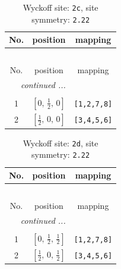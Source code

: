 \documentclass[fleqn,8pt]{jsarticle}
\begin{document}
\renewcommand{\arraystretch}{1.2}
\begin{longtable}{ccc}
\caption{Wyckoff site: {\tt 2c}, site symmetry: {\tt 2.22}}
 \\
 \hline \hline
No. & position & mapping \\ \hline \endfirsthead

\multicolumn{2}{l}{\tablename\ \thetable{}} \\
 \hline \hline
No. & position & mapping \\ \hline \endhead

 \hline \hline
\multicolumn{2}{r}{\footnotesize\it continued ...} \\ \endfoot

 \hline \hline
\multicolumn{2}{r}{} \\ \endlastfoot

1 & $\left[ 0,\, \frac{1}{2},\, 0 \right]$ & {\tt [1,2,7,8]} \\ \hline
2 & $\left[ \frac{1}{2},\, 0,\, 0 \right]$ & {\tt [3,4,5,6]} \\
\end{longtable}
\renewcommand{\arraystretch}{1.2}
\begin{longtable}{ccc}
\caption{Wyckoff site: {\tt 2d}, site symmetry: {\tt 2.22}}
 \\
 \hline \hline
No. & position & mapping \\ \hline \endfirsthead

\multicolumn{2}{l}{\tablename\ \thetable{}} \\
 \hline \hline
No. & position & mapping \\ \hline \endhead

 \hline \hline
\multicolumn{2}{r}{\footnotesize\it continued ...} \\ \endfoot

 \hline \hline
\multicolumn{2}{r}{} \\ \endlastfoot

1 & $\left[ 0,\, \frac{1}{2},\, \frac{1}{2} \right]$ & {\tt [1,2,7,8]} \\ \hline
2 & $\left[ \frac{1}{2},\, 0,\, \frac{1}{2} \right]$ & {\tt [3,4,5,6]} \\
\end{longtable}
\renewcommand{\arraystretch}{1.2}
\end{document}
